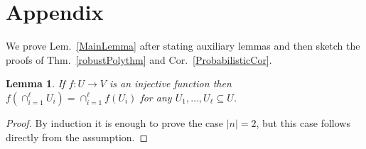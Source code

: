 \documentclass[9pt,twocolumn]{pnas-new}
\newtheorem{lemma}{Lemma}
\begin{document}


\section{Appendix}\label{proofs}

We prove Lem.~\ref{MainLemma} after stating auxiliary lemmas and then sketch the proofs of Thm.~\ref{robustPolythm} and Cor.~\ref{ProbabilisticCor}.


\begin{lemma}\label{spanIntersectionLemma}
If $f: U \to V$ is an injective function then $f\left(\cap_{i=1}^\ell U_i \right) =  \cap_{i=1}^\ell f\left(U_i\right)$ for any $U_1, \ldots, U_\ell \subseteq U$.
\end{lemma}
\begin{proof}
By induction it is enough to prove the case $|n| = 2$, but this case follows directly from the assumption. %
\end{proof}
\end{document}
